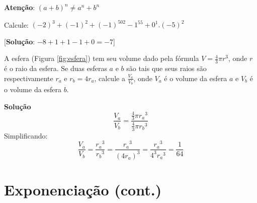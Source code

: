 \textbf{Atenção}: $(a+b)^n \ne a^n+b^n$
\begin{inlinexer}
Calcule: $(-2)^3 + (-1)^2 + (-1)^{502} - 1^{55} + 0^1.(-5)^2$
\begin{flushright}
\tiny[\textbf{Solução}: $-8 + 1 + 1 -1 +0 = -7$]
\end{flushright}
\end{inlinexer}
\begin{exeresol} A esfera (Figura \ref{fig:esfera}) tem seu volume dado pela fórmula $V = \frac{4}{3} \pi r^3$, onde $r$ é o raio da esfera. Se duas esferas $a$ e $b$ são tais que seus raios são respectivamente $r_a$ e $r_b = 4r_a$, calcule a $\frac{V_a}{V_b}$, onde $V_a$ é o volume da esfera $a$ e $V_b$ é o volume da esfera $b$.
\end{exeresol}\textbf{Solução}\\
$$\frac{V_a}{V_b} = \frac{\frac{4}{3} \pi {r_a}^3}{\frac{4}{3} \pi {r_b}^3}$$
Simplificando: 
 $$\frac{V_a}{V_b} = \frac{{r_a}^3}{{r_b}^3} = \frac{{r_a}^3}{(4r_a)^3} = \frac{{r_a}^3}{4^3 {r_a}^3} = \frac{1}{64}$$
\newpage
\section{Exponenciação (cont.)}
